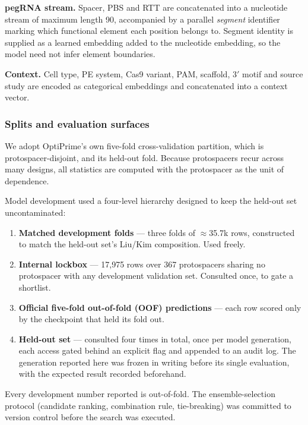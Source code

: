 \documentclass[11pt]{article}
\begin{document}
\textbf{pegRNA stream.} Spacer, PBS and RTT are concatenated into a nucleotide stream
of maximum length 90, accompanied by a parallel \emph{segment} identifier marking which
functional element each position belongs to. Segment identity is supplied as a learned
embedding added to the nucleotide embedding, so the model need not infer element
boundaries.

\textbf{Context.} Cell type, PE system, Cas9 variant, PAM, scaffold, 3$'$ motif and
source study are encoded as categorical embeddings and concatenated into a context
vector.

\subsubsection{Splits and evaluation surfaces}

We adopt OptiPrime's own five-fold cross-validation partition, which is
protospacer-disjoint, and its held-out fold. Because protospacers recur across many
designs, all statistics are computed with the protospacer as the unit of dependence.

Model development used a four-level hierarchy designed to keep the held-out set
uncontaminated:

\begin{enumerate}
\item \textbf{Matched development folds} --- three folds of $\approx$35.7k rows,
constructed to match the held-out set's Liu/Kim composition. Used freely.
\item \textbf{Internal lockbox} --- 17{,}975 rows over 367 protospacers sharing no
protospacer with any development validation set. Consulted once, to gate a shortlist.
\item \textbf{Official five-fold out-of-fold (OOF) predictions} --- each row scored only
by the checkpoint that held its fold out.
\item \textbf{Held-out set} --- consulted four times in total, once per model
generation, each access gated behind an explicit flag and appended to an audit log.
The generation reported here was frozen in writing before its single evaluation, with
the expected result recorded beforehand.
\end{enumerate}

Every development number reported is out-of-fold. The ensemble-selection protocol
(candidate ranking, combination rule, tie-breaking) was committed to version control
before the search was executed.
\end{document}
